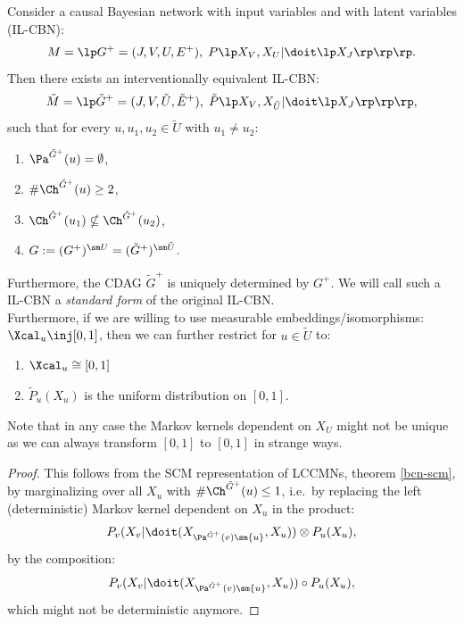 \begin{DefThm}
    \label{bcn-standard-form}
Consider a causal Bayesian network with input variables and with latent variables (IL-CBN):
     \[ M = \lp G^+=(J,V,U,E^+), \; P\lp X_{V}, X_{U}| \doit\lp X_{J} \rp\rp \rp.\]
Then there exists an interventionally equivalent IL-CBN:
\[ \tilde M = \lp \tilde G^+=(J,V,\tilde U,\tilde E^+), \; \tilde P\lp X_{V}, X_{\tilde U}| \doit\lp X_{J} \rp\rp \rp,\]
such that for every $u, u_1, u_2 \in \tilde U$ with $u_1 \neq u_2$:
\begin{enumerate}
    \item $\Pa^{\tilde G^+}(u) = \emptyset$,
    \item $\#\Ch^{\tilde G^+}(u) \ge 2$,
    \item $\Ch^{\tilde G^+}(u_1) \nsubseteq \Ch^{\tilde G^+}(u_2)$,
    \item $G:=(G^+)^{\sm U} = (\tilde G^+)^{\sm \tilde U}$.
\end{enumerate}
Furthermore, the CDAG $\tilde G^+$ is uniquely determined by $G^+$.
We will call such a IL-CBN a \emph{standard form} of the original IL-CBN.\\
Furthermore, if we are willing to use measurable embeddings/isomorphisms: $\Xcal_u \inj [0,1]$, then we 
can further restrict for $u \in \tilde U$ to:
\begin{enumerate}[resume]
    \item $\Xcal_u \cong [0,1]$
    \item $\tilde P_u(X_u)$ is the uniform distribution on $[0,1]$.
\end{enumerate}
Note that in any case the Markov kernels dependent on $X_U$ might not be unique as we can always transform $[0,1]$ to $[0,1]$ in strange ways.
\begin{proof}
    This follows from the SCM representation of LCCMNs, theorem \ref{bcn-scm}, 
    by marginalizing over all $X_u$ with $\#\Ch^{\tilde G^+}(u) \le 1$, i.e.\ by replacing the left (deterministic) 
    Markov kernel dependent on 
    $X_u$ in the product:
    \[P_v(X_v|\doit(X_{\Pa^{\tilde G^+}(v) \sm \{u\}}, X_u)) \otimes P_u(X_u),\]
    by the composition:
    \[P_v(X_v|\doit(X_{\Pa^{\tilde G^+}(v) \sm \{u\}}, X_u)) \circ P_u(X_u),\]
    which might not be deterministic anymore.
\end{proof}
\end{DefThm}

